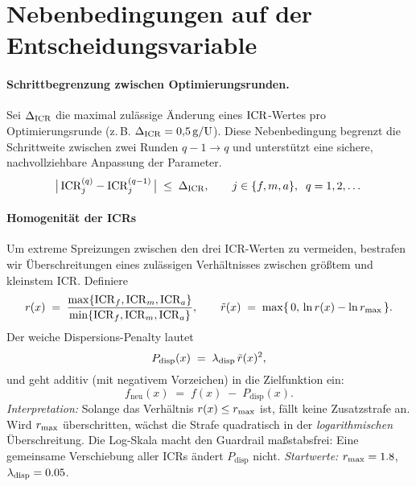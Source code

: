 \section{Nebenbedingungen auf der Entscheidungsvariable}


\paragraph{Schrittbegrenzung zwischen Optimierungsrunden.} Sei \(\Delta_{\mathrm{ICR}}\) die maximal zulässige Änderung eines \(\mathrm{ICR}\)-Wertes pro Optimierungsrunde (z.\,B. \(\Delta_{\mathrm{ICR}}=0{,}5\,\mathrm{g}/\mathrm{U}\)). Diese Nebenbedingung begrenzt die Schrittweite zwischen zwei Runden \(q-1 \to q\) und unterstützt eine sichere, nachvollziehbare Anpassung der Parameter.
\[
\bigl|\,\mathrm{ICR}_j^{(q)} - \mathrm{ICR}_j^{(q-1)}\,\bigr| \;\le\; \Delta_{\mathrm{ICR}},
\qquad j \in \{f,m,a\},\;\; q=1,2,\dots
\]

\medskip

\paragraph{Homogenität der ICRs}
Um extreme Spreizungen zwischen den drei ICR-Werten zu vermeiden, bestrafen wir
Überschreitungen eines zulässigen Verhältnisses zwischen größtem und kleinstem ICR.
Definiere
\[
r(x)\;=\;\frac{\max\{\mathrm{ICR}_f,\mathrm{ICR}_m,\mathrm{ICR}_a\}}{\min\{\mathrm{ICR}_f,\mathrm{ICR}_m,\mathrm{ICR}_a\}},
\qquad
\tilde r(x)\;=\;\max\{\,0,\,\ln r(x)-\ln r_{\max}\,\}.
\]
Der weiche Dispersions-Penalty lautet
\[
P_{\mathrm{disp}}(x)\;=\;\lambda_{\mathrm{disp}}\,\tilde r(x)^{2},
\]
und geht additiv (mit negativem Vorzeichen) in die Zielfunktion ein:
\[
f_{\text{neu}}(x)\;=\;f(x)\;-\;P_{\mathrm{disp}}(x).
\]
\noindent
\textit{Interpretation:} Solange das Verhältnis \(r(x)\le r_{\max}\) ist, fällt keine Zusatzstrafe an.
Wird \(r_{\max}\) überschritten, wächst die Strafe quadratisch in der \emph{logarithmischen} Überschreitung.
Die Log-Skala macht den Guardrail maßstabsfrei: Eine gemeinsame Verschiebung aller ICRs
ändert \(P_{\mathrm{disp}}\) nicht. \textit{Startwerte:} \(r_{\max}=1.8\), \(\lambda_{\mathrm{disp}}=0.05\).